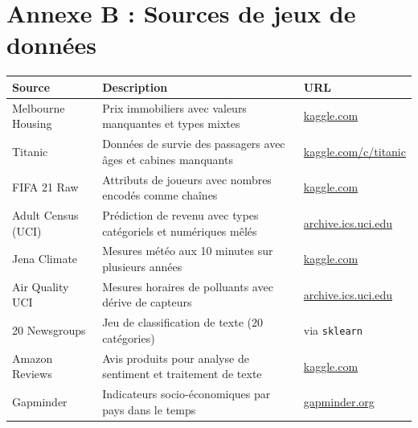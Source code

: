 \documentclass[12pt,a4paper,twoside]{book}
\begin{document}
\chapter*{Annexe B : Sources de jeux de donn\'ees}

\begin{longtable}{p{4cm}p{8cm}p{3cm}}
\toprule
\textbf{Source} & \textbf{Description} & \textbf{URL} \\
\midrule
Melbourne Housing & Prix immobiliers avec valeurs manquantes et types mixtes & \url{kaggle.com} \\
Titanic & Donn\'ees de survie des passagers avec \^ages et cabines manquants & \url{kaggle.com/c/titanic} \\
FIFA 21 Raw & Attributs de joueurs avec nombres encod\'es comme cha\^ines & \url{kaggle.com} \\
Adult Census (UCI) & Pr\'ediction de revenu avec types cat\'egoriels et num\'eriques m\^el\'es & \url{archive.ics.uci.edu} \\
Jena Climate & Mesures m\'et\'eo aux 10 minutes sur plusieurs ann\'ees & \url{kaggle.com} \\
Air Quality UCI & Mesures horaires de polluants avec d\'erive de capteurs & \url{archive.ics.uci.edu} \\
20 Newsgroups & Jeu de classification de texte (20 cat\'egories) & via \texttt{sklearn} \\
Amazon Reviews & Avis produits pour analyse de sentiment et traitement de texte & \url{kaggle.com} \\
Gapminder & Indicateurs socio-\'economiques par pays dans le temps & \url{gapminder.org} \\
\bottomrule
\end{longtable}




\printindex
\end{document}
